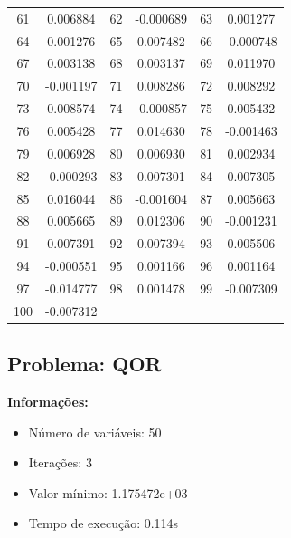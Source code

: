 \documentclass[12pt]{article}
\begin{document}
\begin{longtable}{@{}cc|cc|cc@{}}
61 & 0.006884 & 62 & -0.000689 & 63 & 0.001277 \\
64 & 0.001276 & 65 & 0.007482 & 66 & -0.000748 \\
67 & 0.003138 & 68 & 0.003137 & 69 & 0.011970 \\
70 & -0.001197 & 71 & 0.008286 & 72 & 0.008292 \\
73 & 0.008574 & 74 & -0.000857 & 75 & 0.005432 \\
76 & 0.005428 & 77 & 0.014630 & 78 & -0.001463 \\
79 & 0.006928 & 80 & 0.006930 & 81 & 0.002934 \\
82 & -0.000293 & 83 & 0.007301 & 84 & 0.007305 \\
85 & 0.016044 & 86 & -0.001604 & 87 & 0.005663 \\
88 & 0.005665 & 89 & 0.012306 & 90 & -0.001231 \\
91 & 0.007391 & 92 & 0.007394 & 93 & 0.005506 \\
94 & -0.000551 & 95 & 0.001166 & 96 & 0.001164 \\
97 & -0.014777 & 98 & 0.001478 & 99 & -0.007309 \\
100 & -0.007312 &  &  &  &  \\

\end{longtable}


\newpage            
\subsection{Problema: QOR}

\textbf{Informações:}
\begin{itemize}
\item Número de variáveis: 50
\item Iterações: 3
\item Valor mínimo: 1.175472e+03
\item Tempo de execução: 0.114s
\end{itemize}
\end{document}
